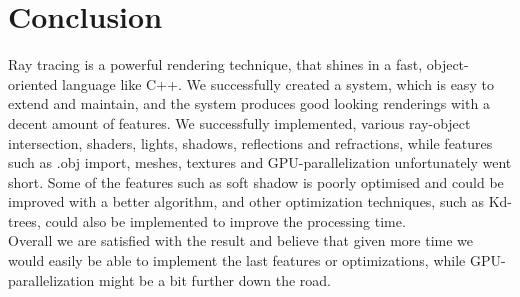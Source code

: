 \section{Conclusion}
Ray tracing is a powerful rendering technique, that shines in a fast, object-oriented language like C++. We successfully created a system, which is easy to extend and maintain, and the system produces good looking renderings with a decent amount of features. We successfully implemented, various ray-object intersection, shaders, lights, shadows, reflections and refractions, while features such as .obj import, meshes, textures and GPU-parallelization unfortunately went short. Some of the features such as soft shadow is poorly optimised and could be improved with a better algorithm, and other optimization techniques, such as Kd-trees, could also be implemented to improve the processing time.\\

Overall we are satisfied with the result and believe that given more time we would easily be able to implement the last features or optimizations, while GPU-parallelization might be a bit further down the road.